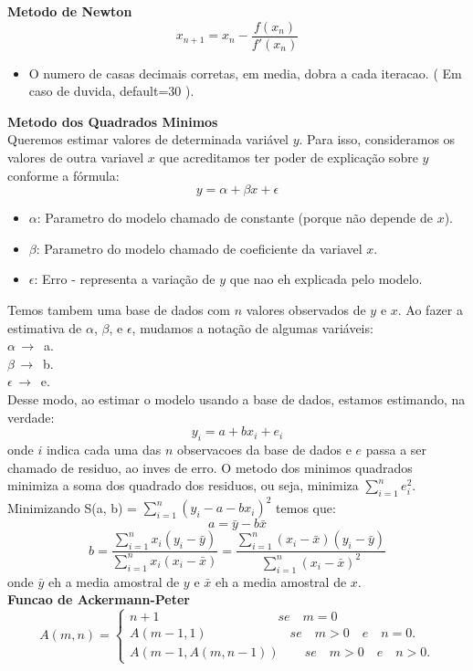 \documentclass[10pt, twocolumn]{article}
\begin{document}
\begin{flushleft}
\textbf{Metodo de Newton}\\
$$x_{n+1} = x_n - \frac{f(x_n)}{f'(x_n)}$$
\begin{itemize}
\item O numero de casas decimais corretas, em media, dobra a cada iteracao. ( Em caso de duvida, default=30 ).
\end{itemize}

\vspace{0.3	cm}

\textbf{Metodo dos Quadrados Minimos}\\
Queremos estimar valores de determinada variável $y$. Para isso, consideramos os valores de outra variavel $x$ que acreditamos ter poder de explicação sobre $y$ conforme a fórmula:
$$y = \alpha + \beta x + \epsilon$$
\begin{itemize}
\item $\alpha$: Parametro do modelo chamado de constante (porque não depende de $x$).
\item $\beta$: Parametro do modelo chamado de coeficiente da variavel $x$.
\item $\epsilon$:  Erro - representa a variação de $y$ que nao eh explicada pelo modelo.
\end{itemize}
Temos tambem uma base de dados com $n$ valores observados de $y$ e $x$. Ao fazer a estimativa de $\alpha$, $\beta$, e $\epsilon$, mudamos a notação de algumas variáveis:\\
$\alpha \, \rightarrow \, $ a.\\
$\beta \, \rightarrow \, $ b.\\
$\epsilon \, \rightarrow \, $ e.\\

Desse modo, ao estimar o modelo usando a base de dados, estamos estimando, na verdade:
$$y_i = a + bx_i + e_i$$
onde $i$ indica cada uma das $n$ observacoes da base de dados e $e$ passa a ser chamado de residuo, ao inves de erro.
O metodo dos minimos quadrados minimiza a soma dos quadrado dos residuos, ou seja, minimiza $\sum_{i=1}^{n} e_i^{2}$. Minimizando S(a, b) = $\sum_{i=1}^{n} (y_i - a - bx_i)^{2}$ temos que:\\
$$a = \bar{y} - b\bar{x}$$
$$b = \frac{\sum_{i=1}^{n} x_i (y_i - \bar{y})}{\sum_{i=1}^{n} x_i(x_i - \bar{x})} = \frac{\sum_{i=1}^{n} (x_i-\bar{x})(y_i - \bar{y})}{\sum_{i=1}^{n} (x_i - \bar{x})^{2}}$$
onde $\bar{y}$ eh a media amostral de $y$ e $\bar{x}$ eh a media amostral de $x$.\\[0.5cm]


\textbf{Funcao de Ackermann-Peter}\\
$$
A(m, n) =
\begin{cases}
n+1                  \; \quad \qquad \qquad \qquad \qquad se \quad m=0\\
A(m-1, 1)            \ \; \qquad \qquad \qquad se \quad m > 0 \quad e \quad n=0.\\
A(m-1, A(m, n-1))    \qquad se \quad m > 0 \quad e \quad n > 0.
\end{cases}
$$


\end{flushleft}
\end{document}
